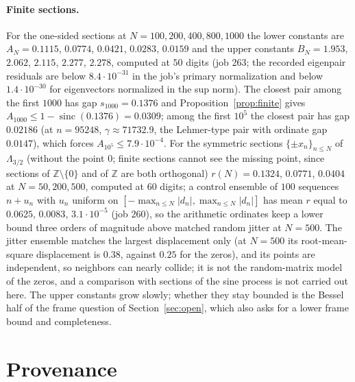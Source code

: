 \documentclass[11pt]{article}
\DeclareMathOperator{\sinc}{sinc}
\newcommand{\Z}{\mathbb{Z}}
\newcommand{\Lam}{\Lambda}
\begin{document}
\paragraph{Finite sections.} For the one-sided sections at $N=100,200,400,800,1000$ the lower constants are $A_N=0.1115$, $0.0774$, $0.0421$, $0.0283$, $0.0159$ and the upper constants $B_N=1.953$, $2.062$, $2.115$, $2.277$, $2.278$, computed at $50$ digits (job 263; the recorded eigenpair residuals are below $8.4\cdot10^{-31}$ in the job's primary normalization and below $1.4\cdot10^{-30}$ for eigenvectors normalized in the sup norm). The closest pair among the first $1000$ has gap $s_{1000}=0.1376$ and Proposition~\ref{prop:finite} gives $A_{1000}\le1-\sinc(0.1376)=0.0309$; among the first $10^5$ the closest pair has gap $0.02186$ (at $n=95248$, $\gamma\approx71732.9$, the Lehmer-type pair with ordinate gap $0.0147$), which forces $A_{10^5}\le7.9\cdot10^{-4}$. For the symmetric sections $\{\pm x_n\}_{n\le N}$ of $\Lam_{3/2}$ (without the point $0$; finite sections cannot see the missing point, since sections of $\Z\setminus\{0\}$ and of $\Z$ are both orthogonal) $r(N)=0.1324$, $0.0771$, $0.0404$ at $N=50,200,500$, computed at $60$ digits; a control ensemble of $100$ sequences $n+u_n$ with $u_n$ uniform on $[-\max_{n\le N}|d_n|,\max_{n\le N}|d_n|]$ has mean $r$ equal to $0.0625$, $0.0083$, $3.1\cdot10^{-5}$ (job 260), so the arithmetic ordinates keep a lower bound three orders of magnitude above matched random jitter at $N=500$. The jitter ensemble matches the largest displacement only (at $N=500$ its root-mean-square displacement is $0.38$, against $0.25$ for the zeros), and its points are independent, so neighbors can nearly collide; it is not the random-matrix model of the zeros, and a comparison with sections of the sine process is not carried out here. The upper constants grow slowly; whether they stay bounded is the Bessel half of the frame question of Section~\ref{sec:open}, which also asks for a lower frame bound and completeness.

\section{Provenance}\label{sec:provenance}
\end{document}
